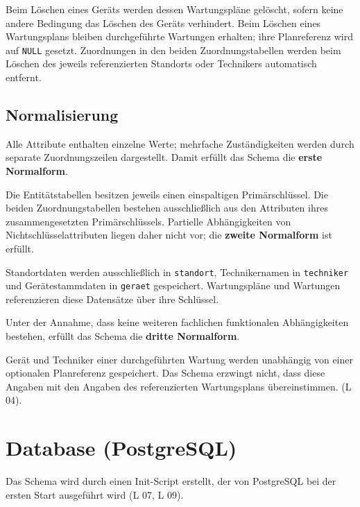 \documentclass[11pt,a4paper]{article}
\begin{document}
Beim Löschen eines Geräts werden dessen Wartungspläne gelöscht,
sofern keine andere Bedingung das Löschen des Geräts verhindert.
Beim Löschen eines Wartungsplans bleiben durchgeführte Wartungen
erhalten; ihre Planreferenz wird auf \texttt{NULL} gesetzt.
Zuordnungen in den beiden Zuordnungstabellen werden beim Löschen
des jeweils referenzierten Standorts oder Technikers automatisch
entfernt.

\subsection{Normalisierung}

Alle Attribute enthalten einzelne Werte; mehrfache Zuständigkeiten
werden durch separate Zuordnungszeilen dargestellt.
Damit erfüllt das Schema die \textbf{erste Normalform}.

Die Entitätstabellen besitzen jeweils einen einspaltigen
Primärschlüssel. Die beiden Zuordnungstabellen bestehen
ausschließlich aus den Attributen ihres zusammengesetzten
Primärschlüssels. Partielle Abhängigkeiten von Nichtschlüsselattributen
liegen daher nicht vor; die \textbf{zweite Normalform} ist erfüllt.

Standortdaten werden ausschließlich in \texttt{standort},
Technikernamen in \texttt{techniker} und Gerätestammdaten
in \texttt{geraet} gespeichert. Wartungspläne und Wartungen
referenzieren diese Datensätze über ihre Schlüssel.

Unter der Annahme, dass keine weiteren fachlichen funktionalen
Abhängigkeiten bestehen, erfüllt das Schema die
\textbf{dritte Normalform}. 

Gerät und Techniker einer durchgeführten Wartung werden unabhängig
von einer optionalen Planreferenz gespeichert. Das Schema erzwingt
nicht, dass diese Angaben mit den Angaben des referenzierten
Wartungsplans übereinstimmen.
(L 04).

\section{Database (PostgreSQL)}

Das Schema wird durch einen Init-Script erstellt, der von PostgreSQL bei der ersten Start ausgeführt wird (L 07, L 09).
\end{document}
